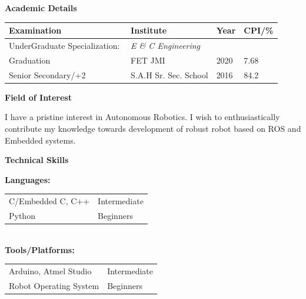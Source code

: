 \documentclass[a4paper,12pt,final]{memoir}
\newcommand{\Sep}{\vspace{1.5em}}
\newcommand{\SmallSep}{\vspace{0.5em}}
\newcommand{\CVSection}[1]
	{\Large\textbf{#1}\par
	\SmallSep\normalsize\normalfont}
\newcommand{\CVItem}[1]
	{\textbf{\color{RoyalBlue} #1}}
\begin{document}
\CVSection{Academic Details}

\indent \begin{tabular}{ l l l l}
\hline
\textbf{\color{RoyalBlue}Examination} & \textbf{\color{RoyalBlue}Institute} & \textbf{\color{RoyalBlue}Year} & \textbf{\color{RoyalBlue}CPI/\%} \\
\hline
UnderGraduate Specialization:\,\, & \textit{E \& C Engineering} \\
Graduation & FET JMI & 2020 & 7.68 \\
\hline
Senior Secondary/+2 & S.A.H Sr. Sec. School & 2016 & 84.2\\
\hline
\end{tabular}
\Sep

\CVSection{Field of Interest}

\begin{compactitem}[\color{RoyalBlue}$\circ$]
\item\noindent I have a pristine interest in Autonomous Robotics. I wish to enthusiastically contribute my knowledge towards development of robust robot based on ROS and Embedded systems.
\end{compactitem}
\SmallSep

\CVSection{Technical Skills}
\CVItem{Languages:}
\\
\begin{tabular}{l l}
C/Embedded C, C++ & Intermediate\\
Python & Beginners
\end{tabular} 
\\
\CVItem{Tools/Platforms:}
\\
\begin{tabular}{l l}
Arduino, Atmel Studio & Intermediate\\
Robot Operating System & Beginners\\

\end{tabular}
\Sep
\end{document}
